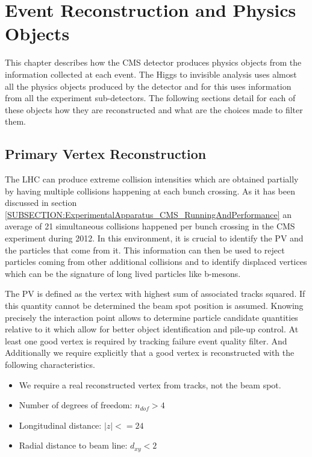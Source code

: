 \chapter{Event Reconstruction and Physics Objects}
\label{CHAPTER:EventReconstructionPhysicsObjects}

\glsresetall %

This chapter describes how the \gls{CMS} detector produces physics objects from the information collected at each event. The  Higgs to invisible analysis uses almost all the physics objects produced by the detector and for this uses information from all the experiment sub-detectors. The following sections detail for each of these objects how they are reconstructed and what are the choices made to filter them.

\section{Primary Vertex Reconstruction}


The \gls{LHC} can produce extreme collision intensities which are obtained partially by having multiple collisions happening at each bunch crossing. As it has been discussed in section \ref{SUBSECTION:ExperimentalApparatus_CMS_RunningAndPerformance} an average of 21 simultaneous collisions happened per bunch crossing in the \gls{CMS} experiment during 2012. In this environment, it is crucial to identify the \gls{PV} and the particles that come from it. This information can then be used to reject particles coming from other additional collisions and to identify displaced vertices which can be the signature of long lived particles like b-mesons.

The \gls{PV} is defined as the vertex with highest sum of associated tracks \pt squared. If this quantity cannot be determined the beam spot position is assumed. Knowing precisely the interaction point allows to determine particle candidate quantities relative to it which allow for better object identification and pile-up control. At least one good vertex is required by tracking failure event quality filter. And Additionally we require explicitly that a good vertex is reconstructed with the following characteristics. 

\begin{itemize}
  \item We require a real reconstructed vertex from tracks, not the beam spot.
  \item Number of degrees of freedom: $n_{dof}>4$
  \item Longitudinal distance: $|z|<=24$         %
  \item Radial distance to beam line: $d_{xy}<2$ %
\end{itemize}

